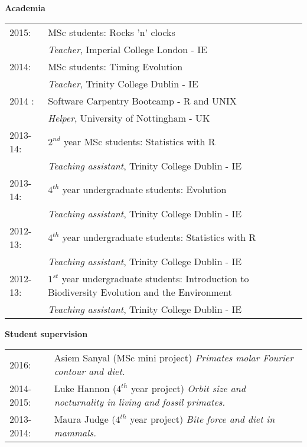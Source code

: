 \documentclass[10pt,a4paper]{article}
\begin{document}
{\raggedright\textbf{Academia}\\[1.5ex]
\begin{tabular}{ll}
2015: & MSc students: Rocks 'n' clocks \\
& \textit{Teacher}, Imperial College London - IE \\
2014: & MSc students: Timing Evolution \\
& \textit{Teacher}, Trinity College Dublin - IE \\
2014 : & Software Carpentry Bootcamp - R and UNIX \\
& \textit{Helper}, University of Nottingham - UK \\
2013-14: & $2^{nd}$ year MSc students: Statistics with R \\
& \textit{Teaching assistant}, Trinity College Dublin - IE \\
2013-14: & $4^{th}$ year undergraduate students: Evolution\\
& \textit{Teaching assistant}, Trinity College Dublin - IE\\
2012-13: & $4^{th}$ year undergraduate students: Statistics with R\\
& \textit{Teaching assistant}, Trinity College Dublin - IE\\
2012-13: & $1^{st}$ year undergraduate students: Introduction to Biodiversity Evolution and the Environment\\
& \textit{Teaching assistant}, Trinity College Dublin - IE\\
\end{tabular}
\raggedright\textbf{Student supervision}\\[1.5ex]
\begin{tabular}{ll}
2016: & Asiem Sanyal (MSc mini project) \textit{Primates molar Fourier contour and diet.}\\
2014-2015: & Luke Hannon ($4^{th}$ year project) \textit{Orbit size and nocturnality in living and fossil primates.}\\
2013-2014: & Maura Judge ($4^{th}$ year project) \textit{Bite force and diet in mammals.} \\
\end{tabular}
\bigskip

}
\end{document}
